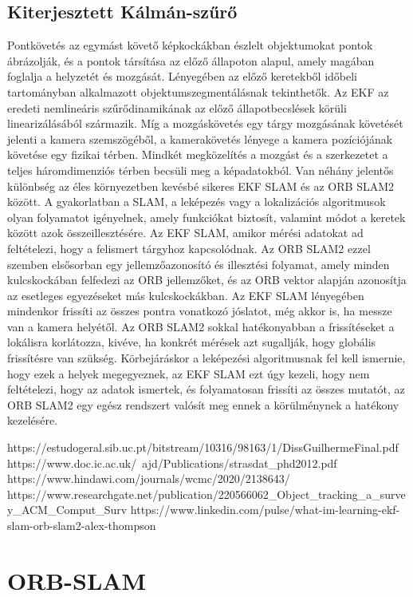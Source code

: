 \subsection{Kiterjesztett Kálmán-szűrő}
Pontkövetés az egymást követő képkockákban észlelt objektumokat pontok ábrázolják, és a pontok társítása az előző állapoton alapul, amely magában foglalja a helyzetét és mozgását. Lényegében az előző keretekből időbeli tartományban alkalmazott objektumszegmentálásnak tekinthetők. Az EKF az eredeti nemlineáris szűrődinamikának az előző állapotbecslések körüli linearizálásából származik. Míg a mozgáskövetés egy tárgy mozgásának követését jelenti a kamera szemszögéből, a kamerakövetés lényege a kamera pozíciójának követése egy fizikai térben. Mindkét megközelítés a mozgást és a szerkezetet a teljes háromdimenziós térben becsüli meg a képadatokból. 
Van néhány jelentős különbség az éles környezetben kevésbé sikeres EKF SLAM és az ORB SLAM2 között. A gyakorlatban a SLAM, a leképezés vagy a lokalizációs algoritmusok olyan folyamatot igényelnek, amely funkciókat biztosít, valamint módot a keretek között azok összeillesztésére. Az EKF SLAM, amikor mérési adatokat ad feltételezi, hogy a felismert tárgyhoz kapcsolódnak. Az ORB SLAM2 ezzel szemben elsősorban egy jellemzőazonosító és illesztési folyamat, amely minden kulcskockában felfedezi az ORB jellemzőket, és az ORB vektor alapján azonosítja az esetleges egyezéseket más kulcskockákban. Az EKF SLAM lényegében mindenkor frissíti az összes pontra vonatkozó jóslatot, még akkor is, ha messze van a kamera helyétől. Az ORB SLAM2 sokkal hatékonyabban a frissítéseket a lokálisra korlátozza, kivéve, ha konkrét mérések azt sugallják, hogy globális frissítésre van szükség. Körbejáráskor a leképezési algoritmusnak fel kell ismernie, hogy ezek a helyek megegyeznek, az EKF SLAM ezt úgy kezeli, hogy nem feltételezi, hogy az adatok ismertek, és folyamatosan frissíti az összes mutatót, az ORB SLAM2 egy egész rendszert valósít meg ennek a körülménynek a hatékony kezelésére.

https://estudogeral.sib.uc.pt/bitstream/10316/98163/1/DissGuilhermeFinal.pdf
https://www.doc.ic.ac.uk/~ajd/Publications/strasdat_phd2012.pdf
https://www.hindawi.com/journals/wcmc/2020/2138643/
https://www.researchgate.net/publication/220566062_Object_tracking_a_survey_ACM_Comput_Surv
https://www.linkedin.com/pulse/what-im-learning-ekf-slam-orb-slam2-alex-thompson

\section{ORB-SLAM}

